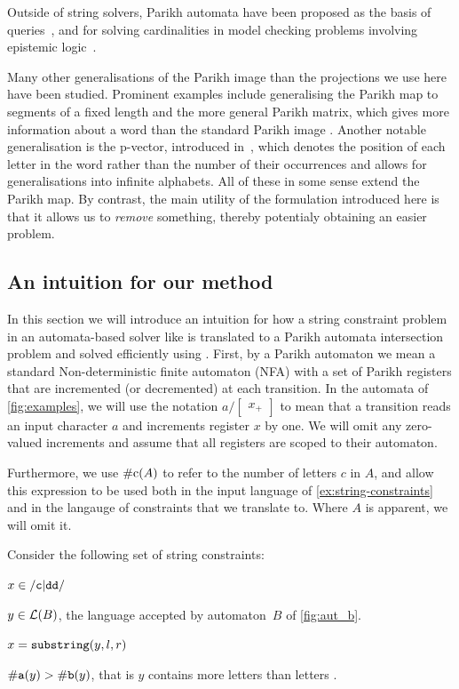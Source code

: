 Outside of string solvers, Parikh automata have been proposed as the basis of
queries~\cite{graph-queries}, and for solving cardinalities in model checking
problems involving epistemic logic~\cite{epistemic-logic}.

Many other generalisations of the Parikh image than the projections we use here have been
studied. Prominent examples include generalising the Parikh map to segments of a
fixed length \cite{KARHUMAKI1980155} and the more general Parikh matrix, which
gives more information about a word than the standard Parikh image
\cite{parikh-matrix}. Another notable generalisation is the p-vector, introduced
in~\cite{infinite-words}, which denotes the position of each letter in the word
rather than the number of their occurrences and allows for generalisations into
infinite alphabets. All of these in some sense extend the Parikh map. By
contrast, the main utility of the formulation introduced here is that it allows
us to \emph{remove} something, thereby potentialy obtaining an easier problem.

\subsection{An intuition for our method}

In this section we will introduce an intuition for how a string constraint problem in an automata-based solver like \OstrichPlus{} is translated to a Parikh automata intersection problem and solved efficiently using \Calculus{}. First, by a Parikh automaton we mean a standard Non-deterministic finite automaton (NFA) with a set of Parikh registers that are incremented (or decremented) at each transition. In the automata of \cref{fig:examples}, we will use the notation $a / \begin{bmatrix} x_+ \end{bmatrix}$ to mean that a transition reads an input character $a$ and increments register $x$ by one. We will omit any zero-valued increments and assume that all registers are scoped to their automaton.

Furthermore, we use $\#\text{c}(A)$ to refer to the number of letters $c$ in $A$, and allow this expression to be used both in the input language of \cref{ex:string-constraints} and in the langauge of constraints that we translate to. Where $A$ is apparent, we will omit it.

\begin{example}\label{ex:string-constraints}
    Consider the following set of string constraints:
\begin{constraints}
    \item\label{const:x-in-c-dd} $x \in \mathtt{\slash c\vert{}dd\slash}$
    \item\label{const:y-in-b} $y \in \operatorname{\mathcal{L}}(B)$, the language accepted by automaton~$B$ of \cref{fig:aut_b}.
    \item\label{const:x-substring} $x = \operatorname{\mathtt{substring}}(y, l, r)$
    \item\label{const:more-a-than-b} $\#\text{\texttt{a}}(y) > \#\text{\texttt{b}}(y)$, that is $y$ contains more letters  than letters .
\end{constraints}
\end{example}


